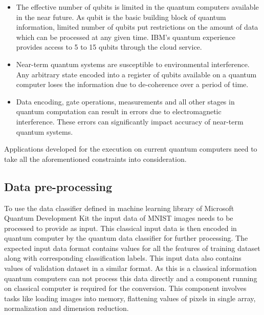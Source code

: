 \documentclass[english,a4paper,11pt,oneside,onecolumn]{book}
\begin{document}
\begin{itemize}
    \item The effective number of qubits is limited in the quantum computers available in the near future. As qubit is the basic building block of quantum information, limited number of qubits put restrictions on the amount of data which can be processed at any given time. IBM's quantum experience provides access to 5 to 15 qubits through the cloud service.
    
    \item Near-term quantum systems are susceptible to environmental interference. Any arbitrary state encoded into a register of qubits available on a quantum computer loses the information due to de-coherence over a period of time.
    
    \item Data encoding, gate operations, measurements and all other stages in quantum computation can result in errors due to electromagnetic interference. These errors can significantly impact accuracy of near-term quantum systems. 
\end{itemize}

Applications developed for the execution on current quantum computers need to take all the aforementioned constraints into consideration.

\subsection{Data pre-processing}
To use the data classifier defined in machine learning library of Microsoft Quantum Development Kit the input data of MNIST images needs to be processed to provide as input. This classical input data is then encoded in quantum computer by the quantum data classifier for further processing. The expected input data format contains values for all the features of training dataset along with corresponding classification labels. This input data also contains values of validation dataset in a similar format. As this is a classical information quantum computers can not process this data directly and a component running on classical computer is required for the conversion. This component involves tasks like loading images into memory, flattening values of pixels in single array, normalization and dimension reduction.
\end{document}
